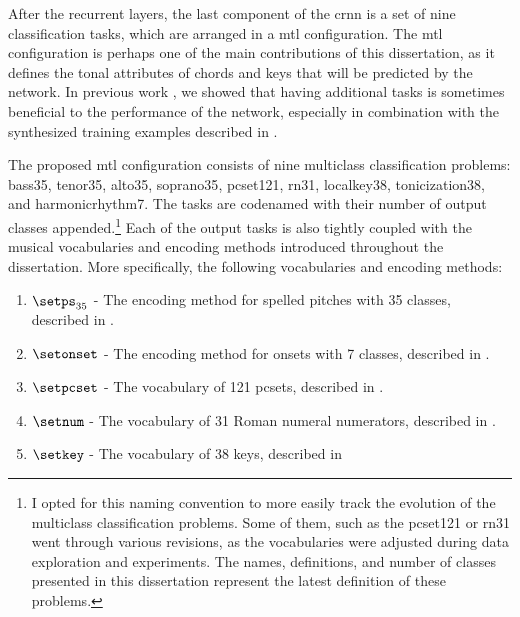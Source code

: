 
After the recurrent layers, the last component of the
\gls{crnn} is a set of nine classification tasks, which are
arranged in a \gls{mtl} configuration. The \gls{mtl}
configuration is perhaps one of the main contributions of
this dissertation, as it defines the tonal attributes of
chords and keys that will be predicted by the network. In
previous work \parencite{napoleslopez2021augmentednet}, we
showed that having additional tasks is sometimes beneficial
to the performance of the network, especially in combination
with the synthesized training examples described in
.

The proposed \gls{mtl} configuration consists of nine
multiclass classification problems: \gls{bass35},
\gls{tenor35}, \gls{alto35}, \gls{soprano35},
\gls{pcset121}, \gls{rn31}, \gls{localkey38},
\gls{tonicization38}, and \gls{harmonicrhythm7}. The tasks
are codenamed with their number of output classes
appended.\footnote{I opted for this naming convention to
more easily track the evolution of the multiclass
classification problems. Some of them, such as the
\gls{pcset121} or \gls{rn31} went through various revisions,
as the vocabularies were adjusted during data exploration
and experiments. The names, definitions, and number of
classes presented in this dissertation represent the latest
definition of these problems.} Each of the output tasks is
also tightly coupled with the musical vocabularies and
encoding methods introduced throughout the dissertation.
More specifically, the following vocabularies and encoding
methods:

\begin{enumerate}
    \item[] $\setps_{35}$ - The encoding method for spelled
    pitches with 35 classes, described in
    .
    \item[] $\setonset$ - The encoding method for onsets
    with 7 classes, described in
    .
    \item[] $\setpcset$ - The vocabulary of 121
    \gls{pcset}s, described in
    .
    \item[] $\setnum$ - The vocabulary of 31 Roman numeral
    numerators, described in
    .
    \item[] $\setkey$ - The vocabulary of 38 keys, described
    in
\end{enumerate}


